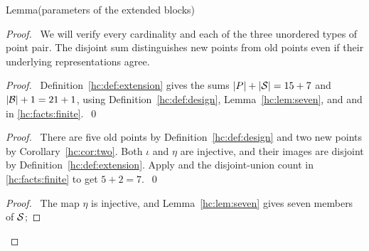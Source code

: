 \begin{mergedproofsection}
\begin{namedresult}{Lemma}{(parameters of the extended blocks)}\label{hc:lem:extension-parameters}
 \leavevmode\par
\end{namedresult}
\begin{proof}
 \pfsketch\ We will verify every cardinality and each of the three
 unordered types of point pair. The disjoint sum distinguishes new
 points from old points even if their underlying representations agree.
 \begin{proof}\pf\ Definition~\ref{hc:def:extension} gives the sums
  $|P|+|{\mathcal S}|=15+7$ and $|{\mathcal B}|+1=21+1$, using
  Definition~\ref{hc:def:design}, Lemma~\ref{hc:lem:seven}, and
   and  in
  \ref{hc:facts:finite}.~\qed\end{proof}
 \begin{proof}\pf\ There are five old points by
  Definition~\ref{hc:def:design} and two new points by
  Corollary~\ref{hc:cor:two}. Both $\iota$ and $\eta$ are injective,
  and their images are disjoint by Definition~\ref{hc:def:extension}.
  Apply  and the disjoint-union
  count in \ref{hc:facts:finite} to get $5+2=7$.~\qed\end{proof}
 \begin{proof}\pf\ The map $\eta$ is injective, and
  Lemma~\ref{hc:lem:seven} gives seven members of ${\mathcal S}$;

\end{proof}
\end{proof}
\end{mergedproofsection}
